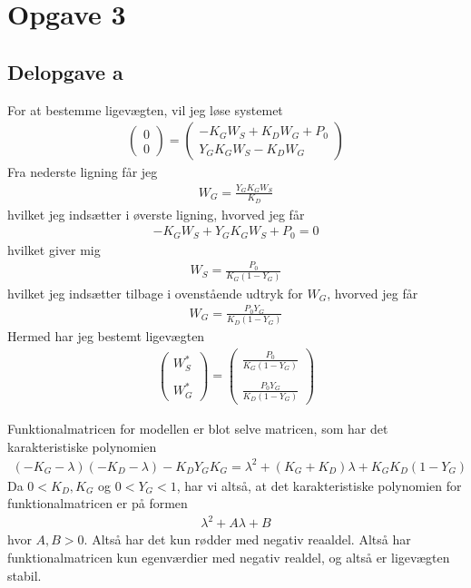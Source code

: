 \documentclass[12pt]{article}
\begin{document}
\section{Opgave 3}

\subsection{Delopgave a}

For at bestemme ligevægten, vil jeg løse systemet
\begin{align}
\begin{pmatrix}
0\\ 0
\end{pmatrix} = \begin{pmatrix}
-K_GW_S + K_DW_G + P_0 \\ 
Y_G K_G W_S - K_DW_G
\end{pmatrix}
\end{align}
Fra nederste ligning får jeg
\begin{align}
W_G = \frac{Y_GK_GW_S}{K_D}
\end{align}
hvilket jeg indsætter i øverste ligning, hvorved jeg får
\begin{align}
-K_GW_S + Y_GK_GW_S + P_0 = 0
\end{align}
hvilket giver mig
\begin{align}
W_S = \frac{P_0}{K_G(1 - Y_G)}
\end{align}
hvilket jeg indsætter tilbage i ovenstående udtryk for $W_G$, hvorved jeg får
\begin{align}
W_G = \frac{P_0Y_G}{K_D(1-Y_G)}
\end{align}
Hermed har jeg bestemt ligevægten
\begin{align}
\begin{pmatrix}
W_S^* \\ \\ W_G^*
\end{pmatrix} = \begin{pmatrix}
\frac{P_0}{K_G(1 - Y_G)} \\ \\
\frac{P_0Y_G}{K_D(1-Y_G)}
\end{pmatrix}
\end{align}

Funktionalmatricen for modellen er blot selve matricen, som har det karakteristiske polynomien
\begin{align}
(-K_G - \lambda)(-K_D - \lambda) - K_DY_GK_G = \lambda^2 + (K_G + K_D)\lambda + K_GK_D(1 - Y_G)
\end{align}
Da $0<K_D, K_G$ og $0<Y_G<1$, har vi altså, at det karakteristiske polynomien for funktionalmatricen er på formen
\begin{align}
\lambda^2 + A\lambda + B
\end{align}
hvor $A, B>0$. Altså har det kun rødder med negativ reaaldel. Altså har funktionalmatricen kun egenværdier med negativ realdel, og altså er ligevægten stabil.
\end{document}
